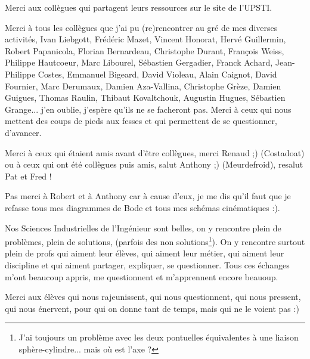 Merci aux collègues qui partagent leurs ressources sur le site de l'UPSTI.

Merci à tous les collègues que j'ai pu (re)rencontrer au gré de mes diverses activités, Ivan Liebgott, Frédéric Mazet, Vincent Honorat, Hervé Guillermin, Robert Papanicola, Florian Bernardeau, Christophe Durant, François Weiss, Philippe Hautcoeur, Marc Libourel, Sébastien Gergadier, Franck Achard, Jean-Philippe Costes, Emmanuel Bigeard, David Violeau, Alain Caignot, David Fournier, Marc Derumaux, Damien Aza-Vallina, Christophe Grèze, Damien Guigues, Thomas Raulin, Thibaut Kovaltchouk, Augustin Hugues, Sébastien Grange... j'en oublie, j'espère qu'ils ne se facheront pas. Merci à ceux qui nous mettent des coups de pieds aux fesses et qui permettent de se questionner, d'avancer. 

Merci à ceux qui étaient amis avant d'être collègues, merci Renaud ;) (Costadoat) ou à ceux qui ont été collègues puis amis, salut Anthony ;) (Meurdefroid), resalut Pat et Fred !

Pas merci à Robert et à Anthony car à cause d'eux, je me dis qu'il faut que je refasse tous mes diagrammes de Bode et tous mes schémas cinématiques :).


Nos Sciences Industrielles de l'Ingénieur sont belles, on y rencontre plein de problèmes, plein de solutions,  (parfois des non solutions\footnote{J'ai toujours un problème avec les deux pontuelles équivalentes à une liaison sphère-cylindre... mais où est l'axe ?}). 
On y rencontre surtout plein de profs qui aiment leur élèves, qui aiment leur métier, qui aiment leur discipline et qui aiment partager, expliquer, se questionner. Tous ces échanges m'ont beaucoup appris, me questionnent et m'apprennent encore beauoup. 

Merci aux élèves qui nous rajeunissent, qui nous questionnent, qui nous pressent, qui nous énervent, pour qui on donne tant de temps, mais qui ne le voient pas :)

